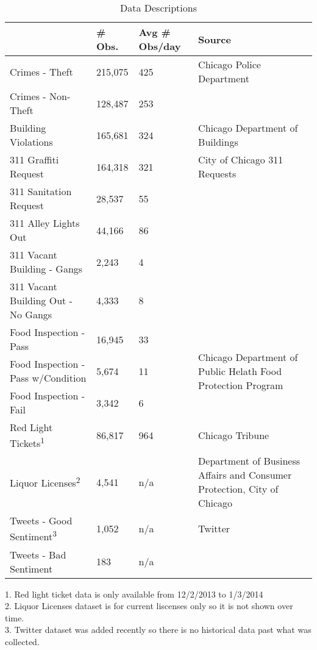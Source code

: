 \documentclass{article}
\begin{document}
\begin{table}
\begin{threeparttable}
\caption{Data Descriptions}
\begin{tabular}{ |p{6cm}||p{2cm}|p{3cm}|p{6cm}|  }
 \hline
 \hline
 & \# Obs. &  Avg \# Obs/day & Source\\
 \hline
 Crimes - Theft                      & 215,075    & 425     & Chicago Police Department \\
 Crimes - Non-Theft                  & 128,487    & 253     & \\
 \hline
 Building Violations                 & 165,681    & 324     & Chicago Department of Buildings\\
 \hline
 311 Graffiti Request                & 164,318    & 321     & City of Chicago 311 Requests \\
 311 Sanitation Request              & 28,537     & 55      & \\
 311 Alley Lights Out                 & 44,166      & 86       & \\
 311 Vacant Building - Gangs         & 2,243      & 4       & \\
 311 Vacant Building Out - No Gangs  & 4,333      & 8       & \\
 \hline
 Food Inspection - Pass              & 16,945     & 33 & \multirow{3}{4cm}{Chicago Department of Public Helath Food Protection Program} \\ 
 Food Inspection - Pass w/Condition  & 5,674      & 11 & \\ 
 Food Inspection - Fail              & 3,342      & 6  & \\ 
 \hline
 Red Light Tickets\textsuperscript{1}                   & 86,817     & 964     & Chicago Tribune\\
 \hline
 Liquor Licenses\textsuperscript{2}                     & 4,541      & n/a     & Department of Business Affairs and Consumer Protection, City of Chicago\\
 \hline
 Tweets - Good Sentiment\textsuperscript{3}          & 1,052        & n/a     & Twitter\\
 Tweets - Bad Sentiment                & 183         & n/a      & \\
 \hline
\end{tabular}
\begin{tablenotes}
      \small
      \item 1. Red light ticket data is only available from 12/2/2013 to 1/3/2014 \\
          2. Liquor Licenses dataset is for current liscenses only so it is not shown over time. \\
          3. Twitter dataset was added recently so there is no historical data past what was collected.
    \end{tablenotes}
    \end{threeparttable}
\end{table}
\end{document}
